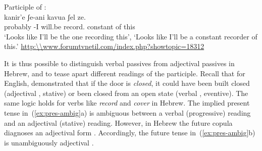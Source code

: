 \begin{exe}
\begin{xlist}
\begin{exe}
\begin{xlist}
\begin{exe}
\begin{exe}
\begin{xlist}
\begin{exe}
\begin{exe}
\begin{xlist}
\begin{exe}
\begin{xlist}
\begin{exe}
\begin{xlist}
\begin{exe}
\begin{xlist}
\begin{xlist}
\begin{exe}
\begin{xlist}
\begin{exe}
\begin{xlist}
\begin{exe}
\begin{exe}
\begin{exe}
\begin{xlist}
\begin{exe}
\begin{exe}
\begin{xlist}
\begin{exe}
\begin{xlist}
\begin{exe}
\begin{xlist}

  \ex  Participle of {\thif}: \\
 	{ \gll kanir'e ʃe-ani   kavua ʃel ze.\\
        probably -I will.be record. constant of this\\
      \glt `Looks like I'll be the one recording this', `Looks like I'll be a constant recorder of this.' \hfill \url{http:\\www.forumtvnetil.com/index.php?showtopic=18312} } 
 
 \z
\z 

It is thus possible to distinguish verbal passives from adjectival passives in Hebrew, and to tease apart different readings of the participle. Recall that for English, \cite{embick04li} demonstrated that if the door is \emph{closed}, it could have been built closed (adjectival , stative) or been closed from an open state (verbal , eventive). The same logic holds for verbs like \emph{record} and \emph{cover} in Hebrew. The implied present tense in~(\ref{ex:pres-ambig}a) is ambiguous between a verbal (progressive) reading and an adjectival (stative) reading. However, in Hebrew the future copula diagnoses an adjectival  form \citep{doron00}. Accordingly, the future tense in~(\ref{ex:pres-ambig}b) is unambiguously adjectival \citep{doron00,horvathsiloni08,meltzerasscher11}.
 \begin{exe}
 \ex  \label{ex:pres-ambig} 
 \begin{xlist} 
    

\end{xlist}
\end{exe}
\end{xlist}
\end{exe}
\end{xlist}
\end{exe}
\end{xlist}
\end{exe}
\end{exe}
\end{xlist}
\end{exe}
\end{exe}
\end{exe}
\end{xlist}
\end{exe}
\end{xlist}
\end{exe}
\end{xlist}
\end{xlist}
\end{exe}
\end{xlist}
\end{exe}
\end{xlist}
\end{exe}
\end{xlist}
\end{exe}
\end{exe}
\end{xlist}
\end{exe}
\end{exe}
\end{xlist}
\end{exe}
\end{xlist}
\end{exe}
